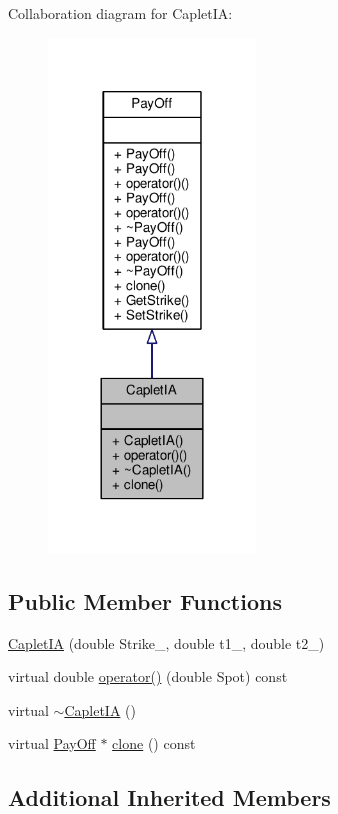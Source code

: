 Collaboration diagram for Caplet\+IA\+:
\nopagebreak
\begin{figure}[H]
\begin{center}
\leavevmode
\includegraphics[width=156pt]{classCapletIA__coll__graph}
\end{center}
\end{figure}
\subsection*{Public Member Functions}
\begin{DoxyCompactItemize}
\item 
\hyperlink{classCapletIA_aa5244330f5862e096ad16103e2b85688}{Caplet\+IA} (double Strike\+\_\+, double t1\+\_\+, double t2\+\_\+)
\item 
virtual double \hyperlink{classCapletIA_a8dca8c52160a378ac2331ce95c688313}{operator()} (double Spot) const
\item 
virtual \hyperlink{classCapletIA_a05baa7e93ab0962a85520477dc820f51}{$\sim$\+Caplet\+IA} ()
\item 
virtual \hyperlink{classPayOff}{Pay\+Off} $\ast$ \hyperlink{classCapletIA_aebfbd05a398b551b43ac3118732934ba}{clone} () const
\end{DoxyCompactItemize}
\subsection*{Additional Inherited Members}


